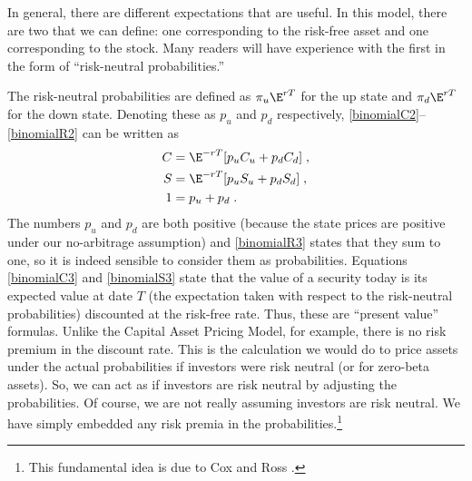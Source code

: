In general, there are different expectations that are useful.  In this model, there are two that we can define: one corresponding to the risk-free asset and one corresponding to the stock.  Many readers will have experience with the first in the form of ``risk-neutral probabilities.''  

The risk-neutral probabilities are defined as $\pi_u\E^{rT}$ for the up state and $\pi_d\E^{rT}$ for the down state.  Denoting these as $p_u$ and $p_d$ respectively,  \eqref{binomialC2}--\eqref{binomialR2} can be written as
\begin{subequations}\begin{align}
C &= \E^{-rT}[p_uC_u+p_dC_d]\;,\label{binomialC3}\\
S &= \E^{-rT}[p_uS_u+p_dS_d]\;,\label{binomialS3}\\
1&= p_u+p_d\;.\label{binomialR3}
\end{align}\end{subequations}
The numbers $p_u$ and $p_d$ are both positive (because the state prices are positive under our no-arbitrage assumption) and \eqref{binomialR3} states that they sum to one, so it is indeed sensible to consider them as probabilities.
Equations \eqref{binomialC3} and \eqref{binomialS3} state that the value of a security today is its expected value at date $T$ (the expectation taken with respect to the risk-neutral probabilities) discounted at the risk-free rate.  Thus, these are ``present value'' formulas.  Unlike the Capital Asset Pricing Model, for example, there is no risk premium in the discount rate.  This is the calculation we would do to price assets under the actual probabilities if investors were risk neutral (or for zero-beta assets).  So, we can act as if investors are risk neutral by adjusting the probabilities.  Of course, we are not really assuming investors are risk neutral.  We have simply embedded any risk premia in the probabilities.\footnote{This fundamental idea is due to Cox and Ross \cite{CR}.}

